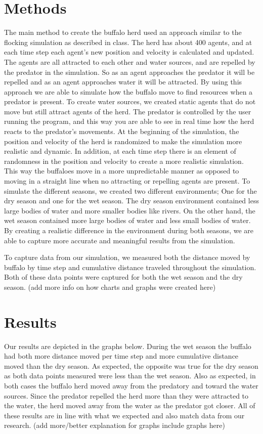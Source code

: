 \documentclass[12pt]{article}
\begin{document}
\section*{Methods}

The main method to create the buffalo herd used an approach similar to the flocking simulation as described in class. The herd has about 400 agents, and at each time step each agent's new position and velocity is calculated and updated. The agents are all attracted to each other and water sources, and are repelled by the predator in the simulation. So as an agent approaches the predator it will be repelled and as an agent approaches water it will be attracted. By using this approach we are able to simulate how the buffalo move to find resources when a predator is present.
To create water sources, we created static agents that do not move but still attract agents of the herd. The predator is controlled by the user running the program, and this way you are able to see in real time how the herd reacts to the predator's movements.
At the beginning of the simulation, the position and velocity of the herd is randomized to make the simulation more realistic and dynamic. In addition, at each time step there is an element of randomness in the position and velocity to create a more realistic simulation. This way the buffaloes move in a more unpredictable manner as opposed to moving in a straight line when no attracting or repelling agents are present.
To simulate the different seasons, we created two different environments; One for the dry season and one for the wet season. The dry season environment contained less large bodies of water and more smaller bodies like rivers. On the other hand, the wet season contained more large bodies of water and less small bodies of water. By creating a realistic difference in the environment during both seasons, we are able to capture more accurate and meaningful results from the simulation. 

To capture data from our simulation, we measured both the distance moved by buffalo by time step and cumulative distance traveled throughout the simulation. Both of these data points were captured for both the wet season and the dry season.
(add more info on how charts and graphs were created here)

\section*{Results}

Our results are depicted in the graphs below. During the wet season the buffalo had both more distance moved per time step and more cumulative distance moved than the dry season. As expected, the opposite was true for the dry season as both data points measured were less than the wet season. Also as expected, in both cases the buffalo herd moved away from the predatory and toward the water sources. Since the predator repelled the herd more than they were attracted to the water, the herd moved away from the water as the predator got closer. All of these results are in line with what we expected and also match data from our research.
(add more/better explanation for graphs include graphs here)
\end{document}
